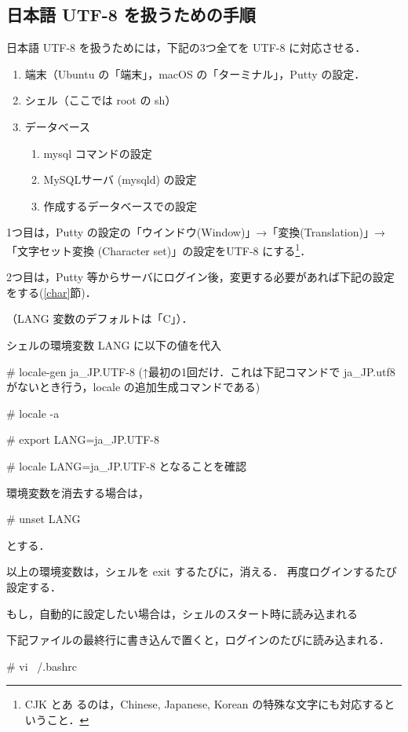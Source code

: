\subsection{日本語 UTF-8 を扱うための手順}
\label{sec:japanese-locale}

日本語 UTF-8 を扱うためには，下記の3つ全てを UTF-8 に対応させる．
\begin{enumerate}
 \item 端末（Ubuntu の「端末」，macOS の「ターミナル」，Putty の設定．
 \item シェル（ここでは root の sh）
 \item データベース
       \begin{enumerate}
	\item mysql コマンドの設定
	\item MySQLサーバ (mysqld) の設定
	\item 作成するデータベースでの設定
       \end{enumerate}
\end{enumerate}

1つ目は，Putty の設定の「ウインドウ(Window)」→「変換(Translation)」→
「文字セット変換 (Character set)」の設定をUTF-8 にする\footnote{CJK とあ
るのは，Chinese, Japanese, Korean の特殊な文字にも対応するということ．}．

2つ目は，Putty 等からサーバにログイン後，変更する必要があれば下記の設定
をする(\ref{char}節)．

（LANG 変数のデフォルトは「C」）．

\begin{cli}
シェルの環境変数 LANG に以下の値を代入

# locale-gen ja_JP.UTF-8
(↑最初の1回だけ．これは下記コマンドで ja_JP.utf8 がないとき行う，locale の追加生成コマンドである)

# locale -a

# export LANG=ja_JP.UTF-8

# locale
LANG=ja_JP.UTF-8
となることを確認

環境変数を消去する場合は，

# unset LANG

とする．

以上の環境変数は，シェルを exit するたびに，消える．
再度ログインするたび設定する．

もし，自動的に設定したい場合は，シェルのスタート時に読み込まれる

下記ファイルの最終行に書き込んで置くと，ログインのたびに読み込まれる．

# vi ~/.bashrc

\end{cli}

